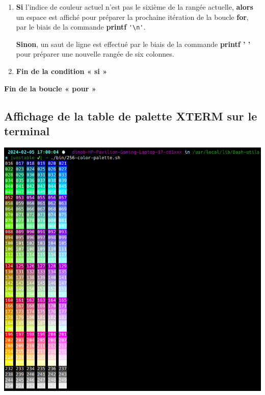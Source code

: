 \documentclass[a4paper,10pt]{article}
\begin{document}
\begin{justify}
\begin{enumerate}
    	    \item
    	    {
                \textbf{\color{cond}Si} l'indice de couleur actuel n'est pas le sixième de la rangée actuelle, \textbf{\color{cond}alors} un espace est affiché pour préparer la prochaine itération de la boucle \textbf{\color{loop}for}, par le biais de la commande \textbf{\color{cmds}printf} \verb|'\n'|.

                \textbf{\color{cond}Sinon}, un saut de ligne est effectué par le biais de la commande \textbf{\color{cmds}printf ' '} pour préparer une nouvelle rangée de six colonnes.
            }

    	    \item \textbf{\color{cond}Fin de la condition « si »}
    	\end{enumerate}

    	\textbf{\color{loop}Fin de la boucle « pour »}
    \end{justify}




    \newpage

    \color{sec2}
    \subsection{Affichage de la table de palette XTERM sur le terminal}\color{text}

    \begin{justify}
    	\includegraphics[scale=0.5884]{../../00 DATA/img/XTERM palette table.png}
    \end{justify}




\end{document}
